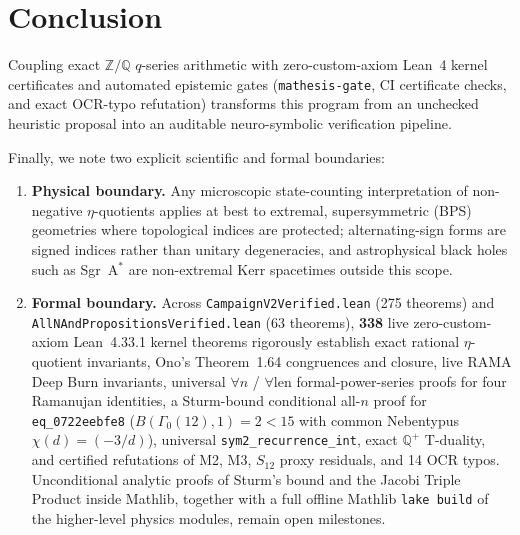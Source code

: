 \section{Conclusion}
Coupling exact $\mathbb{Z}/\mathbb{Q}$ $q$-series arithmetic with zero-custom-axiom Lean~4 kernel certificates and automated epistemic gates (\texttt{mathesis-gate}, CI certificate checks, and exact OCR-typo refutation) transforms this program from an unchecked heuristic proposal into an auditable neuro-symbolic verification pipeline.

Finally, we note two explicit scientific and formal boundaries:
\begin{enumerate}
  \item \textbf{Physical boundary.} Any microscopic state-counting interpretation of non-negative $\eta$-quotients applies at best to extremal, supersymmetric (BPS) geometries where topological indices are protected; alternating-sign forms are signed indices rather than unitary degeneracies, and astrophysical black holes such as Sgr~A$^*$ are non-extremal Kerr spacetimes outside this scope.
  \item \textbf{Formal boundary.} Across \texttt{CampaignV2Verified.lean} (275 theorems) and \texttt{AllNAndPropositionsVerified.lean} (63 theorems), \textbf{338} live zero-custom-axiom Lean~4.33.1 kernel theorems rigorously establish exact rational $\eta$-quotient invariants, Ono's Theorem~1.64 congruences and closure, live RAMA Deep Burn invariants, universal $\forall n$ / $\forall\text{len}$ formal-power-series proofs for four Ramanujan identities, a Sturm-bound conditional all-$n$ proof for \texttt{eq\_0722eebfe8} ($B(\Gamma_0(12),1)=2<15$ with common Nebentypus $\chi(d)=(-3/d)$), universal \texttt{sym2\_recurrence\_int}, exact $\mathbb{Q}^+$ T-duality, and certified refutations of M2, M3, $S_{12}$ proxy residuals, and 14 OCR typos. Unconditional analytic proofs of Sturm's bound and the Jacobi Triple Product inside Mathlib, together with a full offline Mathlib \texttt{lake build} of the higher-level physics modules, remain open milestones.
\end{enumerate}
